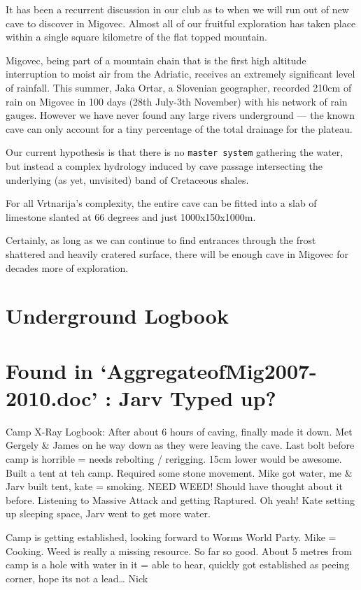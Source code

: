 It has been a recurrent discussion in our club as to when we will run
out of new cave to discover in Migovec. Almost all of our fruitful
exploration has taken place within a single square kilometre of the flat
topped mountain.

Migovec, being part of a mountain chain that is the first high altitude
interruption to moist air from the Adriatic, receives an extremely
significant level of rainfall. This summer, Jaka Ortar, a Slovenian
geographer, recorded 210cm of rain on Migovec in 100 days (28th July-3th
November) with his network of rain gauges. However we have never found
any large rivers underground --- the known cave can only account for a
tiny percentage of the total drainage for the plateau.

Our current hypothesis is that there is no \texttt{master system}
gathering the water, but instead a complex hydrology induced by cave
passage intersecting the underlying (as yet, unvisited) band of
Cretaceous shales.

For all Vrtnarija's complexity, the entire cave can be fitted into a
slab of limestone slanted at 66 degrees and just 1000x150x1000m.

Certainly, as long as we can continue to find entrances through the
frost shattered and heavily cratered surface, there will be enough cave
in Migovec for decades more of exploration.

\section{Underground Logbook}

\section{Found in `AggregateofMig2007-2010.doc' : Jarv Typed up?}

Camp X-Ray Logbook: After about 6 hours of caving, finally made it down.
Met Gergely \& James on he way down as they were leaving the cave. Last
bolt before camp is horrible = needs rebolting / rerigging. 15cm lower
would be awesome. Built a tent at teh camp. Required some stone
movement. Mike got water, me \& Jarv built tent, kate = smoking. NEED
WEED! Should have thought about it before. Listening to Massive Attack
and getting Raptured. Oh yeah! Kate setting up sleeping space, Jarv went
to get more water.

Camp is getting established, looking forward to Worms World Party. Mike
= Cooking. Weed is really a missing resource. So far so good. About 5
metres from camp is a hole with water in it = able to hear, quickly got
established as peeing corner, hope its not a lead\ldots{} Nick

